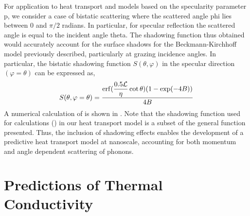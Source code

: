 For application to heat transport and models based on the specularity parameter \gls{p}, we consider a case of bistatic scattering where the scattered angle \gls{phi} lies between 0 and $\pi/2$ radians. In particular, for specular reflection the scattered angle is equal to the incident angle \gls{theta}. The shadowing function thus obtained would accurately account for the surface shadows for the Beckmann-Kirchhoff model previously described, particularly at grazing incidence angles. In particular, the bistatic shadowing function $S(\theta,\varphi)$ in the specular direction $(\varphi=\theta)$ can be expressed as,
\begin{equation}\label{eq:shadowing}
 S(\theta,\varphi=\theta)=\dfrac{\operatorname{erf}(\dfrac{0.5\mathcal{L}}{\eta}\cot\theta)(1-\exp(-4B))}{4B}	  	
\end{equation}
A numerical calculation of  is shown in . Note that the shadowing function used for calculations () in our heat transport model is a subset of the general function presented. Thus, the inclusion of shadowing effects enables the development of a predictive heat transport model at nanoscale, accounting for both momentum and angle dependent scattering of phonons.
\section{Predictions of Thermal Conductivity}
